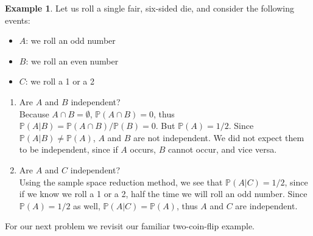 \documentclass[12pt]{article}
\theoremstyle{definition}
\newtheorem*{example}{Example}
\theoremstyle{remark}
\def\P{{\mathbb P}}
\begin{document}
\begin{example}
Let us roll a single fair, six-sided die, and consider the following events:
\begin{itemize}
\item $A$: we roll an odd number
\item $B$: we roll an even number
\item $C$: we roll a 1 or a 2
\end{itemize}
\begin{enumerate}
\item Are $A$ and $B$ independent? \\

Because $A \cap B = \emptyset$, $\P(A \cap B) = 0$, thus $\P(A|B) = \P(A \cap B) / \P(B) = 0$. But $\P(A) = 1/2$. Since $\P(A|B) \neq \P(A)$, $A$ and $B$ are not independent. We did not expect them to be independent, since if $A$ occurs, $B$ cannot occur, and vice versa.
\item Are $A$ and $C$ independent? \\

Using the sample space reduction method, we see that $\P(A|C) = 1/2$, since if we know we roll a 1 or a 2, half the time we will roll an odd number. Since $\P(A) = 1/2$ as well, $\P(A|C) = \P(A)$, thus $A$ and $C$ are independent.
\end{enumerate}
\end{example}

For our next problem we revisit our familiar two-coin-flip example.
\end{document}
